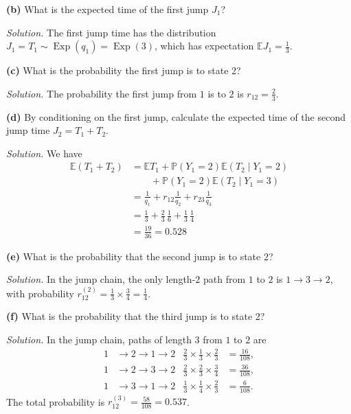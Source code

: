\documentclass[
  a4paper,
]{article}
\theoremstyle{definition}
\theoremstyle{definition}
\theoremstyle{definition}
\theoremstyle{remark}
\begin{document}
\textbf{(b)} What is the expected time of the first jump \(J_1\)?

\begin{myanswers}
\emph{Solution.}
The first jump time has the distribution \(J_1 = T_1 \sim \operatorname{Exp}(q_1) = \operatorname{Exp}(3)\), which has expectation \(\mathbb E J_1 = \frac13\).

\end{myanswers}

\textbf{(c)} What is the probability the first jump is to state 2?

\begin{myanswers}
\emph{Solution.}
The probability the first jump from \(1\) is to \(2\) is \(r_{12} = \frac23\).

\end{myanswers}

\textbf{(d)} By conditioning on the first jump, calculate the expected time of the second jump time \(J_2 = T_1 + T_2\).

\begin{myanswers}
\emph{Solution.}
We have
\begin{align*}
\mathbb E(T_1 + T_2) &= \mathbb ET_1 + \mathbb P(Y_1 = 2) \mathbb E(T_2 \mid Y_1 = 2) \\ &\qquad{}+ \mathbb P(Y_1 = 2) \mathbb E(T_2 \mid Y_1 = 3) \\&= \frac1{q_1} + r_{12} \frac{1}{q_2} + r_{23} \frac{1}{q_3} \\&= \tfrac13 + \tfrac23 \, \tfrac16 + \tfrac13 \, \tfrac14 \\ &= \tfrac{19}{36} = 0.528
\end{align*}

\end{myanswers}

\textbf{(e)} What is the probability that the second jump is to state 2?

\begin{myanswers}
\emph{Solution.}
In the jump chain, the only length-\(2\) path from \(1\) to \(2\) is \(1 \to 3 \to 2\), with probability \(r_{12}^{(2)}=\frac13 \times \frac34 = \frac14\).

\end{myanswers}

\textbf{(f)} What is the probability that the third jump is to state 2?

\begin{myanswers}
\emph{Solution.}
In the jump chain, paths of length \(3\) from \(1\) to \(2\) are
\begin{align*}
    1 &\to 2 \to 1 \to 2 & \tfrac23 \times \tfrac13 \times \tfrac23 &= \tfrac{16}{108} ,    \\
    1 &\to 2 \to 3 \to 2 & \tfrac23 \times \tfrac23 \times \tfrac34 &=  \tfrac{36}{108} ,   \\
    1 &\to 3 \to 1 \to 2 & \tfrac13 \times \tfrac14 \times \tfrac23 &=  \tfrac{6}{108} .
    \end{align*}
The total probability is \(r_{12}^{(3)} = \frac{58}{108} = 0.537\).

\end{myanswers}
\end{document}
